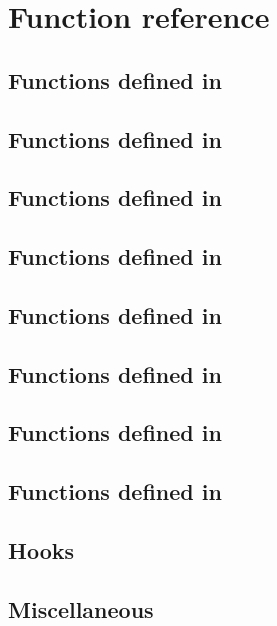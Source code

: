 \chapter{Function reference}
\label{sec:exports}

\section{Functions defined in }
\label{sec:ioncoreref}


\section{Functions defined in }
\label{sec:tilingref}


%

\section{Functions defined in }
\label{sec:queryref}


\section{Functions defined in }
\label{sec:menuref}


\section{Functions defined in }
\label{sec:dockref}


\section{Functions defined in }
\label{sec:spref}


\section{Functions defined in }
\label{sec:statusbarref}


\section{Functions defined in }
\label{sec:deref}


\section{Hooks}
\label{sec:hookref}


\section{Miscellaneous}
\label{sec:miscref}

